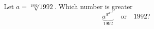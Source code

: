 Let $ a=\sqrt[1992]{1992}$. Which number is greater\[ \underbrace{a^{a^{a^{\ldots^{a}}}}}_{1992}\quad\text{or}\quad 1992?

\]